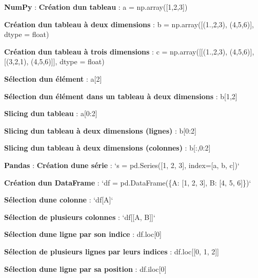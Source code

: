 {\bfseries Num\+Py} \+: {\bfseries Création d\textquotesingle{}un tableau} \+: {\ttfamily a = np.\+array(\mbox{[}1,2,3\mbox{]})}

{\bfseries Création d\textquotesingle{}un tableau à deux dimensions} \+: {\ttfamily b = np.\+array(\mbox{[}(1.,2,3), (4,5,6)\mbox{]}, dtype = float)}

{\bfseries Création d\textquotesingle{}un tableau à trois dimensions} \+: {\ttfamily c = np.\+array(\mbox{[}\mbox{[}(1.,2,3), (4,5,6)\mbox{]},\mbox{[}(3,2,1), (4,5,6)\mbox{]}\mbox{]}, dtype = float)}

{\bfseries Sélection d\textquotesingle{}un élément} \+: {\ttfamily a\mbox{[}2\mbox{]}}

{\bfseries Sélection d\textquotesingle{}un élément dans un tableau à deux dimensions} \+: {\ttfamily b\mbox{[}1,2\mbox{]}}

{\bfseries Slicing d\textquotesingle{}un tableau} \+: {\ttfamily a\mbox{[}0\+:2\mbox{]}}

{\bfseries Slicing d\textquotesingle{}un tableau à deux dimensions (lignes)} \+: {\ttfamily b\mbox{[}0\+:2\mbox{]}}

{\bfseries Slicing d\textquotesingle{}un tableau à deux dimensions (colonnes)} \+: {\ttfamily b\mbox{[}\+:,0\+:2\mbox{]}}

{\bfseries Pandas} \+: {\bfseries Création d\textquotesingle{}une série} \+: `s = pd.\+Series(\mbox{[}1, 2, 3\mbox{]}, index=\mbox{[}\textquotesingle{}a\textquotesingle{}, \textquotesingle{}b\textquotesingle{}, \textquotesingle{}c\textquotesingle{}\mbox{]})`

{\bfseries Création d\textquotesingle{}un Data\+Frame} \+: `df = pd.\+Data\+Frame(\{\textquotesingle{}A\textquotesingle{}\+: \mbox{[}1, 2, 3\mbox{]}, \textquotesingle{}B\textquotesingle{}\+: \mbox{[}4, 5, 6\mbox{]}\})`

{\bfseries Sélection d\textquotesingle{}une colonne} \+: `df\mbox{[}\textquotesingle{}A\textquotesingle{}\mbox{]}`

{\bfseries Sélection de plusieurs colonnes} \+: `df\mbox{[}\mbox{[}\textquotesingle{}A\textquotesingle{}, \textquotesingle{}B\textquotesingle{}\mbox{]}\mbox{]}`

{\bfseries Sélection d\textquotesingle{}une ligne par son indice} \+: {\ttfamily df.\+loc\mbox{[}0\mbox{]}}

{\bfseries Sélection de plusieurs lignes par leurs indices} \+: {\ttfamily df.\+loc\mbox{[}\mbox{[}0, 1, 2\mbox{]}\mbox{]}}

{\bfseries Sélection d\textquotesingle{}une ligne par sa position} \+: {\ttfamily df.\+iloc\mbox{[}0\mbox{]}}

